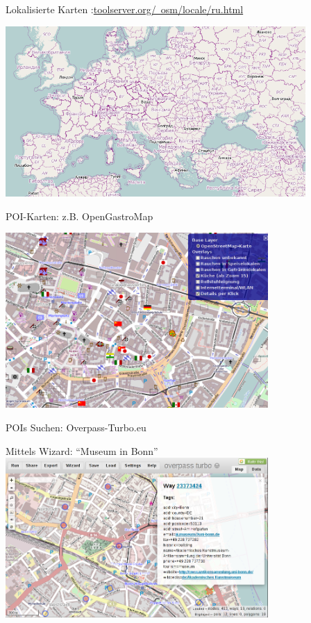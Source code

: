 \documentclass{beamer}
\begin{document}
\hypersetup{urlcolor=cyan}
\begin{frame}{Lokalisierte Karten :\hfill\href{http://toolserver.org/~osm/locale/ru.html}{toolserver.org/~osm/locale/ru.html}}
	\begin{center}
		\vspace{-1cm}
		\includegraphics[height=6.5cm]{style-russ.png}
	\end{center}
\end{frame}
\hypersetup{urlcolor=blue}



\begin{frame}{POI-Karten: z.B. OpenGastroMap}

 \includegraphics[width=10cm]{opengastromap-de.png}

\end{frame}

\begin{frame}{POIs Suchen: Overpass-Turbo.eu}

	Mittels Wizard: "`Museum in Bonn"'
\vfill
 \includegraphics[width=10cm]{overpass.png}

\end{frame}
\end{document}
